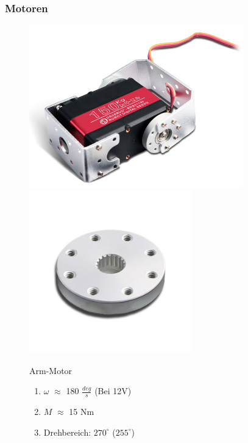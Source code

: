 \documentclass[aspectratio=169]{beamer}
\begin{document}
\begin{frame}[label = Motor2]
	\frametitle{Motoren}
	\begin{figure}[h]
		\begin{minipage}[c]{.46\linewidth}
			\centering
			\begin{overprint}
				 \includegraphics[height = 200pt]{../resources/UpperServo.png}
				\onslide<2> \includegraphics[height = 200pt]{../resources/ServoDisc.png}
			\end{overprint}		\end{minipage}
		\hfill%
		\begin{minipage}[c]{.46\linewidth}
			\begin{block}{Arm-Motor}
				\begin{enumerate}
					\item $\omega$ $\approx$ 180 $\frac{deg}{s}$ (Bei 12$\si{\volt}$)
					\item $M$ $\approx$ 15 $\si{\newton}\si{\meter}$
					\item Drehbereich: $270^\circ$ ($255^\circ$)
				\end{enumerate}
			\end{block}
		\end{minipage}
	\end{figure}
\end{frame}
\end{document}
